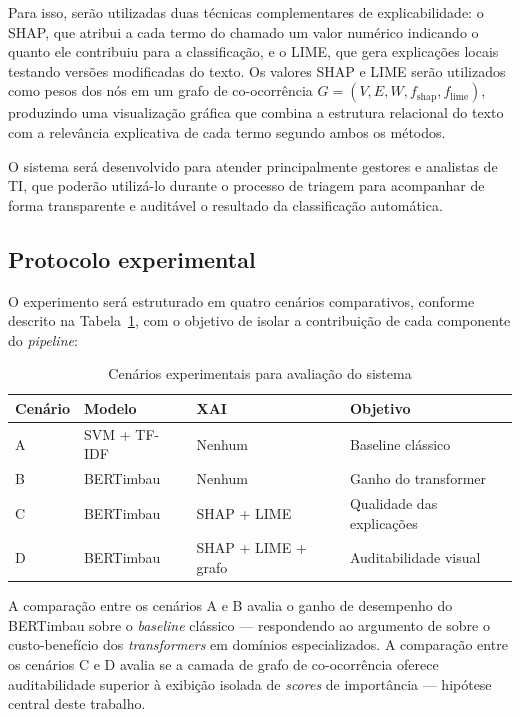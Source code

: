 \documentclass[
    12pt,                %
    openright,           %
    oneside,             %
    a4paper,             %
    english,             %
    brazil               %
]{abntex2}
\begin{document}
Para isso, serão utilizadas duas técnicas complementares de 
explicabilidade: o SHAP, que atribui a cada termo do chamado um 
valor numérico indicando o quanto ele contribuiu para a 
classificação, e o LIME, que gera explicações locais testando 
versões modificadas do texto. Os valores SHAP e LIME serão 
utilizados como pesos dos nós em um grafo de co-ocorrência 
$G = (V, E, W, f_{\text{shap}}, f_{\text{lime}})$, produzindo 
uma visualização gráfica que combina a estrutura relacional do 
texto com a relevância explicativa de cada termo segundo ambos 
os métodos.

O sistema será desenvolvido para atender principalmente gestores 
e analistas de TI, que poderão utilizá-lo durante o processo de 
triagem para acompanhar de forma transparente e auditável o 
resultado da classificação automática.

\subsection{Protocolo experimental}
\label{subsec:experimentos}

O experimento será estruturado em quatro cenários comparativos, conforme descrito na Tabela~\ref{tab:cenarios}, com o objetivo de isolar a contribuição de cada componente do \textit{pipeline}:

\begin{table}[H]
\centering
\caption{Cenários experimentais para avaliação do sistema}
\label{tab:cenarios}
\begin{tabular}{p{1.5cm} p{3.5cm} p{3.5cm} p{4.5cm}}
\toprule
\textbf{Cenário} & \textbf{Modelo} & \textbf{XAI} & \textbf{Objetivo} \\
\midrule
A & SVM + TF-IDF & Nenhum & Baseline clássico \\
B & BERTimbau & Nenhum & Ganho do transformer \\
C & BERTimbau & SHAP + LIME & Qualidade das explicações \\
D & BERTimbau & SHAP + LIME + grafo & Auditabilidade visual \\
\bottomrule
\end{tabular}
\end{table}

A comparação entre os cenários A e B avalia o ganho de desempenho do BERTimbau sobre o \textit{baseline} clássico — respondendo ao argumento de  sobre o custo-benefício dos \textit{transformers} em domínios especializados. A comparação entre os cenários C e D avalia se a camada de grafo de co-ocorrência oferece auditabilidade superior à exibição isolada de \textit{scores} de importância — hipótese central deste trabalho.
\end{document}
